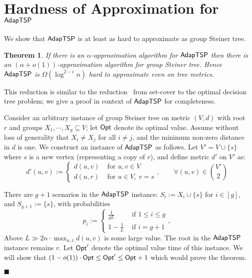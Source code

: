 \documentclass[11pt]{article}
\newtheorem{theorem}[thm]{Theorem}
\def\sse{\subseteq}
\def\opt{{\sf Opt}\xspace}
\def\stsp{\ensuremath{{\sf AdapTSP}}\xspace}
\def\dtp{optimal decision tree problem\xspace}
\newenvironment{pf}{

\noindent{\bf Proof:}} {\hfill$\blacksquare$


}
\begin{document}
  


\appendix


\section{Hardness of Approximation for \stsp}
\label{app:hardness}

We show that \stsp is at least as hard to approximate as group Steiner tree.
\begin{theorem}\label{th:iso-hard}
If there is an $\alpha$-approximation algorithm for \stsp then there is an  $(\alpha+o(1))$-approximation algorithm for group Steiner tree.
Hence \stsp is $\Omega(\log^{2-\epsilon}n)$ hard to approximate even on tree metrics.
\end{theorem}
\begin{pf}
This reduction is similar to the reduction~\cite{CPRAM11} from set-cover to the \dtp; we give a proof in
context of \stsp for completeness.

  Consider an arbitrary instance of group Steiner tree on metric $(V,d)$
  with root $r$ and groups $X_1,\cdots,X_g\sse V$; let $\opt$ denote its
  optimal value. Assume without loss of generality that $X_i\ne X_j$ for
  all $i\ne j$, and the minimum non-zero distance in $d$ is one. We construct an instance of \stsp as follows. Let
  $V'=V\cup\{s\}$ where $s$ is a new vertex (representing a copy of $r$), and define metric $d'$ on
  $V'$ as:
  $$d'(u,v) :=\left\{
    \begin{array}{ll}
      d(u,v) & \mbox{ for }u,v \in V\\
      d(u,r) & \mbox{ for }u\in V,~v=s
    \end{array}\right.,\qquad \forall (u,v)\in {V'\choose 2}
  $$

There are $g+1$ scenarios in the \stsp instance: $S_i:=X_i\cup \{s\}$ for $i\in[g]$,
  and $S_{g+1}:=\{s\}$, with probabilities
  $$p_i :=\left\{
    \begin{array}{ll}
      \frac1{gL} & \mbox{ if }1\le i\le g\\
      1-\frac1L & \mbox{ if }i=g+1
    \end{array}\right.,
  $$
Above $L\gg 2 n\cdot \max_{u,v} d(u,v)$ is some large value. The root in the \stsp instance remains $r$. Let $\opt'$
denote the optimal value time of this instance. We will show that $(1-o(1))\cdot \opt\le \opt'\le \opt+1$ which would
prove the  theorem.


\end{pf}
\end{document}
